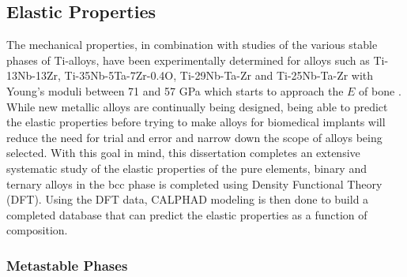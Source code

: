 \subsection{Elastic Properties}

The mechanical properties, in combination with studies of the various stable phases of Ti-alloys, have been experimentally determined for alloys such as Ti-13Nb-13Zr, Ti-35Nb-5Ta-7Zr-0.4O, Ti-29Nb-Ta-Zr and Ti-25Nb-Ta-Zr with Young's moduli between 71 and 57 GPa which starts to approach the $E$ of bone \cite{Long1998a,Tane2008a,Tane2010a}. While new metallic alloys are continually being designed, being able to predict the elastic properties before trying to make alloys for biomedical implants will reduce the need for trial and error and narrow down the scope of alloys being selected. With this goal in mind, this dissertation completes an extensive systematic study of the elastic properties of the pure elements, binary and ternary alloys in the bcc phase is completed using Density Functional Theory (DFT). Using the DFT data, CALPHAD modeling is then done to build a completed database that can predict the elastic properties as a function of composition.

\subsubsection{Metastable Phases}

